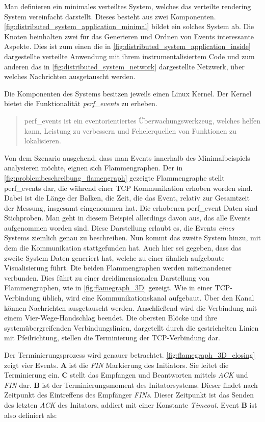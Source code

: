 Man definieren ein minimales verteiltes System, welches das verteilte rendering System vereinfacht darstellt. Dieses besteht aus zwei Komponenten. \cref{fig:distributed_system_application_minimal} bildet ein solches System ab. Die Knoten beinhalten zwei für das Generieren und Ordnen von Events interessante Aspekte. Dies ist zum einen die in \cref{fig:distributed_system_application_inside} dargestellte verteilte Anwendung mit ihrem instrumentalisiertem Code und zum anderen das in \cref{fig:distributed_system_network} dargestellte Netzwerk, über welches Nachrichten ausgetauscht werden. 

Die Komponenten des Systems besitzen jeweils einen Linux Kernel. Der Kernel bietet die Funktionalität \emph{perf\_events} zu erheben. 
\begin{quote}
	perf\_events ist ein eventorientiertes Überwachungswerkzeug, welches helfen kann, Leistung zu verbessern und Fehelerquellen von Funktionen zu lokalisieren. 
\end{quote}
Von dem Szenario ausgehend, dass man Events innerhalb des Minimalbeispiels analysieren möchte, eignen sich Flammengraphen.
 Der in \cref{fig:problembeschreibung_flamengraph} gezeigte Flammengraphe stellt perf\_events dar, die während einer TCP Kommunikation erhoben worden sind.  Dabei ist die Länge der Balken, die Zeit, die das Event, relativ zur Gesamtzeit der Messung, insgesamt eingenommen hat. Die erhobenen perf\_event Daten sind Stichproben. Man geht in diesem Beispiel allerdings davon aus, das alle Events aufgenommen worden sind. Diese Darstellung erlaubt es, die Events \emph{eines} Systems ziemlich genau zu beschreiben. Nun kommt das zweite System hinzu, mit dem die Kommunikation stattgefunden hat. Auch hier sei gegeben, dass das zweite System Daten generiert hat, welche zu einer ähnlich aufgebaute Visualisierung führt. Die beiden Flammengraphen werden miteinandener verbunden. Dies führt zu einer dreidimensionalen Darstellung von Flammengraphen, wie in \cref{fig:flamegraph_3D} gezeigt. Wie in einer TCP-Verbindung üblich, wird eine Kommunikationskanal aufgebaut. Über den Kanal können Nachrichten ausgetauscht werden. Anschließend wird die Verbindung mit einem Vier-Wege-Handschlag beendet. Die obersten Blöcke und ihre systemübergreifenden Verbindungslinien, dargetellt durch die gestrichelten Linien mit Pfeilrichtung, stellen die Terminierung der TCP-Verbindung dar.
 
 Der Terminierungsprozess wird genauer betrachtet. \cref{fig:flamegraph_3D_closing} zeigt vier Events. \textbf{A} ist die \emph{FIN} Markierung des Initiators. Sie leitet die Terminierung ein. \textbf{C} stellt das Empfangen und Beantworten mittels \emph{ACK} und \emph{FIN} dar. \textbf{B} ist der Terminierungsmoment des Initatorsystems. Dieser findet nach Zeitpunkt des Eintreffens des Empfänger \emph{FINs}. Dieser Zeitpunkt ist das Senden des letzten \emph{ACK} des Initators, addiert mit einer Konstante \emph{Timeout}.  Event \textbf{B} ist also definiert als:
 
